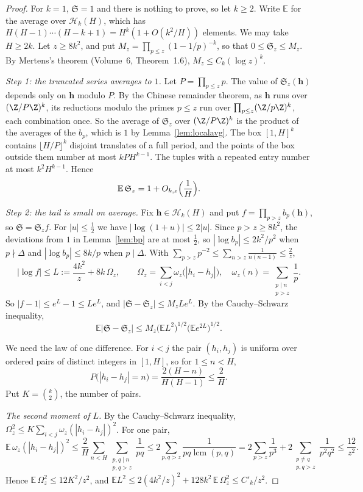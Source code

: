 \begin{proof}
For $k=1$, $\mathfrak S=1$ and there is nothing to prove, so let $k\ge2$. Write $\mathbb E$ for the average over $\mathcal H_k(H)$, which has $H(H-1)\cdots(H-k+1)=H^k(1+O(k^2/H))$ elements. We may take $H\ge2k$. Let $z\ge8k^2$, and put $M_z=\prod_{p\le z}(1-1/p)^{-k}$, so that $0\le\mathfrak S_z\le M_z$. By Mertens's theorem (Volume~6, Theorem~1.6), $M_z\le C_k(\log z)^k$.

\emph{Step 1: the truncated series averages to $1$.} Let $P=\prod_{p\le z}p$. The value of $\mathfrak S_z(\mathbf h)$ depends only on $\mathbf h$ modulo $P$. By the Chinese remainder theorem, as $\mathbf h$ runs over $(\Z/P\Z)^k$, its reductions modulo the primes $p\le z$ run over $\prod_{p\le z}(\Z/p\Z)^k$, each combination once. So the average of $\mathfrak S_z$ over $(\Z/P\Z)^k$ is the product of the averages of the $b_p$, which is $1$ by Lemma~\ref{lem:localavg}. The box $[1,H]^k$ contains $\lfloor H/P\rfloor^k$ disjoint translates of a full period, and the points of the box outside them number at most $kPH^{k-1}$. The tuples with a repeated entry number at most $k^2H^{k-1}$. Hence
\[
\mathbb E\,\mathfrak S_z=1+O_{k,z}\Bigl(\frac1H\Bigr).
\]

\emph{Step 2: the tail is small on average.} Fix $\mathbf h\in\mathcal H_k(H)$ and put $f=\prod_{p>z}b_p(\mathbf h)$, so $\mathfrak S=\mathfrak S_zf$. For $|u|\le\frac12$ we have $|\log(1+u)|\le2|u|$. Since $p>z\ge8k^2$, the deviations from $1$ in Lemma~\ref{lem:bp} are at most $\frac12$, so $|\log b_p|\le2k^2/p^2$ when $p\nmid\Delta$ and $|\log b_p|\le8k/p$ when $p\mid\Delta$. With $\sum_{p>z}p^{-2}\le\sum_{n>z}\frac1{n(n-1)}\le\frac2z$,
\[
|\log f|\le L:=\frac{4k^2}z+8k\,\Omega_z,\qquad\Omega_z=\sum_{i<j}\omega_z\bigl(|h_i-h_j|\bigr),\quad\omega_z(n)=\sum_{\substack{p\mid n\\p>z}}\frac1p.
\]
So $|f-1|\le e^L-1\le Le^L$, and $|\mathfrak S-\mathfrak S_z|\le M_zLe^L$. By the Cauchy--Schwarz inequality,
\[
\mathbb E|\mathfrak S-\mathfrak S_z|\le M_z\bigl(\mathbb E L^2\bigr)^{1/2}\bigl(\mathbb E e^{2L}\bigr)^{1/2}.
\]

We need the law of one difference. For $i<j$ the pair $(h_i,h_j)$ is uniform over ordered pairs of distinct integers in $[1,H]$, so for $1\le n<H$,
\[
P\bigl(|h_i-h_j|=n\bigr)=\frac{2(H-n)}{H(H-1)}\le\frac2H.
\]
Put $K=\binom k2$, the number of pairs.

\emph{The second moment of $L$.} By the Cauchy--Schwarz inequality, $\Omega_z^2\le K\sum_{i<j}\omega_z(|h_i-h_j|)^2$. For one pair,
\[
\mathbb E\,\omega_z(|h_i-h_j|)^2\le\frac2H\sum_{n<H}\sum_{\substack{p,q\mid n\\p,q>z}}\frac1{pq}\le2\sum_{p,q>z}\frac1{pq\operatorname{lcm}(p,q)}=2\sum_{p>z}\frac1{p^3}+2\sum_{\substack{p\ne q\\p,q>z}}\frac1{p^2q^2}\le\frac{12}{z^2}.
\]
Hence $\mathbb E\,\Omega_z^2\le12K^2/z^2$, and $\mathbb E L^2\le2(4k^2/z)^2+128k^2\,\mathbb E\,\Omega_z^2\le C'_k/z^2$.


\end{proof}
